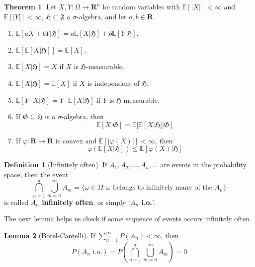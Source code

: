 \documentclass[12pt,a4paper]{article}
\theoremstyle{definition}
\newtheorem{theorem}{Theorem}[section]
\newtheorem{lemma}[theorem]{Lemma}
\newtheorem{definition}{Definition}[section]
\begin{document}
\begin{theorem}
	Let $X, Y : \Omega \longrightarrow \textbf{R}^n$ be random variables with $\mathbb{E}[|X|] < \infty$ and $\mathbb{E}[|Y|] < \infty$, $\mathfrak{H} \subseteq \mathfrak{F}$ a $\sigma$-algebra, and let $a, b \in \textbf{R}$.
	\begin{enumerate}
		\item $\mathbb{E} [ a X + b Y | \mathfrak{H}] = a \mathbb{E} [X | \mathfrak{H}] + b \mathbb{E} [Y | \mathfrak{H}]$.
		\item $\mathbb{E} [ \mathbb{E} [X | \mathfrak{H}] ] = \mathbb{E} [X]$.
		\item $\mathbb{E} [X | \mathfrak{H}] = X$ if $X$ is $\mathfrak{H}$-measurable.
		\item $\mathbb{E} [X | \mathfrak{H}] = \mathbb{E} [X]$ if $X$ is independent of $\mathfrak{H}$.
		\item $\mathbb{E} [Y \cdot X | \mathfrak{H}] = Y \cdot \mathbb{E} [X | \mathfrak{H}]$ if $Y$ is $\mathfrak{H}$-measurable.
		\item If $\mathfrak{G} \subseteq \mathfrak{H}$ is a $\sigma$-algebra, then \[ \mathbb{E} [X | \mathfrak{G}] = \mathbb{E} [ \mathbb{E} [X | \mathfrak{H}] | \mathfrak{G}] \]
		\item If $\varphi : \textbf{R} \longrightarrow \textbf{R}$ is convex and $\mathbb{E} [ | \varphi (X) | ] < \infty$, then \[ \varphi (\mathbb{E} [X | \mathfrak{H}]) \leq \mathbb{E} [\varphi(X) | \mathfrak{H}] \]
	\end{enumerate}
\end{theorem}

\begin{definition}[Infinitely often]
If $A_1, A_2, \ldots, A_n, \ldots$ are events in the probability space, then the event
\[
	\bigcap_{n=1}^\infty \bigcup_{m=n}^\infty A_m = \{ \omega \in \Omega : \omega \text{ belongs to infinitely many of the } A_n \}
\]
is called \textbf{$A_n$ infinitely often}, or simply `\textbf{$A_n$ i.o.}'.
\end{definition}

The next lemma helps us check if some sequence of events occurs infinitely often.

\begin{lemma}[Borel-Cantelli]
	If $\sum_{n=1}^\infty P(A_n) < \infty$, then
	\[
		P(A_n \text{ i.o.}) = P \left( \bigcap_{n=1}^\infty \bigcup_{m=n}^\infty A_m \right) = 0
	\]
\end{lemma}

\end{document}
